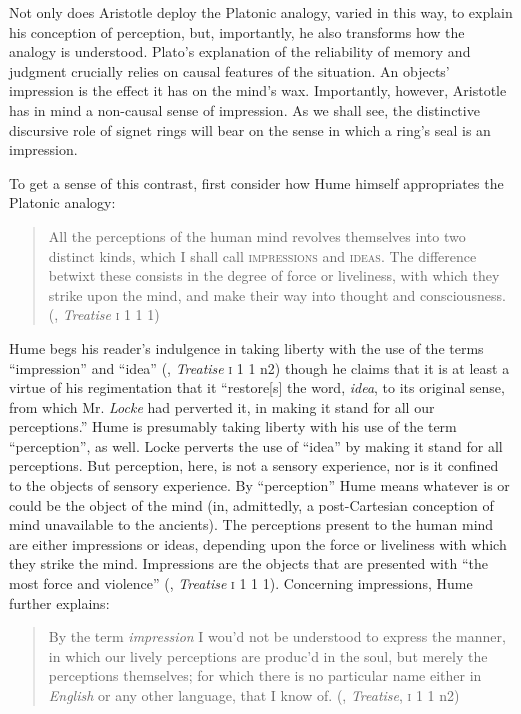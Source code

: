 Not only does Aristotle deploy the Platonic analogy, varied in this way, to explain his conception of perception, but, importantly, he also transforms how the analogy is understood. Plato's explanation of the reliability of memory and judgment crucially relies on causal features of the situation. An objects' impression is the effect it has on the mind's wax. Importantly, however, Aristotle has in mind a non-causal sense of impression. As we shall see, the distinctive discursive role of signet rings will bear on the sense in which a ring's seal is an impression.

To get a sense of this contrast, first consider how Hume himself appropriates the Platonic analogy:
\begin{quote}
	All the perceptions of the human mind revolves themselves into two distinct kinds, which I shall call \textsc{impressions} and \textsc{ideas}. The difference betwixt these consists in the degree of force or liveliness, with which they strike upon the mind, and make their way into thought and consciousness. (\citealt{Hume:1739kx}, \emph{Treatise} \textsc{i} 1 1 1)
\end{quote}
Hume begs his reader's indulgence in taking liberty with the use of the terms ``impression'' and ``idea'' (\citealt{Hume:1739kx}, \emph{Treatise} \textsc{i} 1 1 n2) though he claims that it is at least a virtue of his regimentation that it ``restore[s] the word, \emph{idea}, to its original sense, from which Mr. \emph{Locke} had perverted it, in making it stand for all our perceptions.'' Hume is presumably taking liberty with his use of the term ``perception'', as well. Locke perverts the use of ``idea'' by making it stand for all perceptions. But perception, here, is not a sensory experience, nor is it confined to the objects of sensory experience. By ``perception'' Hume means whatever is or could be the object of the mind (in, admittedly, a post-Cartesian conception of mind unavailable to the ancients). The perceptions present to the human mind are either impressions or ideas, depending upon the force or liveliness with which they strike the mind. Impressions are the objects that are presented with ``the most force and violence'' (\citealt{Hume:1739kx}, \emph{Treatise} \textsc{i} 1 1 1).  Concerning impressions, Hume further explains:
\begin{quote}
	By the term \emph{impression} I wou'd not be understood to express the manner, in which our lively perceptions are produc'd in the soul, but merely the perceptions themselves; for which there is no particular name either in \emph{English} or any other language, that I know of. (\citealt{Hume:1739kx}, \emph{Treatise}, \textsc{i} 1 1 n2)
\end{quote}
